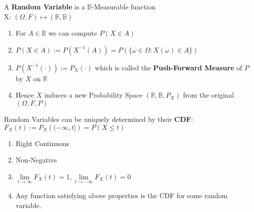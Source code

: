 \documentclass[a4paper,portrait,columns=2]{cheatsheet}
\begin{document}
A \textbf{Random Variable} is a \(\mathbb{B}\)-Measurable function \\
X: \( (\Omega, F) \mapsto (\mathbb{R},\mathbb{B}) \)
\begin{enumerate}
	\item For \( A \in \mathbb{B}\) we can compute \( P(X \in A)\)
	\item \( P(X \in A) := P(X^{-1}(A)) = P(\{ \omega \in \Omega : X(\omega) \in A \})\)
	\item \( P(X^{-1}(\cdot)) := P_X(\cdot)\) which is called the \textbf{Push-Forward Measure} of \(P\) by \(X\) on \( \mathbb{R}\)
	\item Hence \( X\) induces a new Probability Space \((\mathbb{R}, \mathbb{B}, P_X) \) from the original \( (\Omega, F, P)\)
\end{enumerate}


Random Variables can be uniquely determined by their \textbf{CDF}:
\( F_X(t) := P_X\left((-\infty,t]\right) = P(X \le t) \)
\begin{enumerate}
	\item Right Continuous
	\item Non-Negative
	\item \(\lim\limits_{t \to \infty} F_X(t) = 1, \lim\limits_{t \to -\infty} F_X(t) = 0\)
	\item Any function satisfying above properties is the CDF for some random variable.
\end{enumerate}
\end{document}
